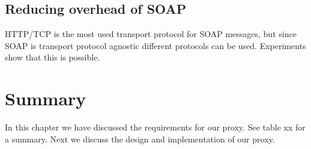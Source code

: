 \subsection{Reducing overhead of SOAP}

HTTP/TCP is the most used transport protocol for SOAP messages, but since SOAP
is transport protocol agnostic different protocols can be used. Experiments show
that this is possible.


\section{Summary}

In this chapter we have discussed the requirements for our proxy. See table xx
for a summary. Next we discuss the design and implementation of our proxy.
